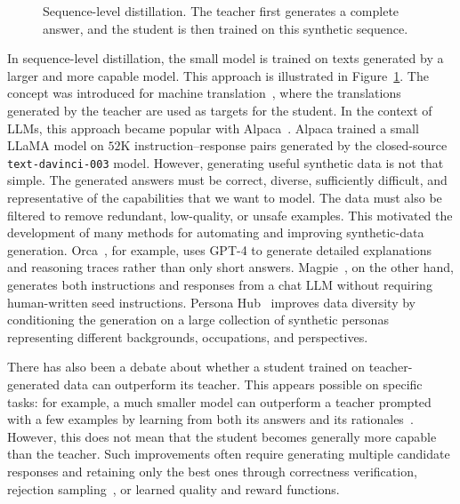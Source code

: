 \begin{figure}[!ht]
    \caption{Sequence-level distillation. The teacher first generates a complete answer, and the student is then trained on this synthetic sequence.}
    \label{fig:sequence-level-distillation}
\end{figure}

In sequence-level distillation, the small model is trained on texts generated by a larger and more capable model. 
This approach is illustrated in Figure~\ref{fig:sequence-level-distillation}. 
The concept was introduced for machine translation~\citep{kim2016sequence},
where the translations generated by the teacher are used as targets for the student.
In the context of LLMs, this approach became popular with Alpaca~\citep{taori2023alpaca}. Alpaca trained a small LLaMA model on $52$K instruction--response 
pairs generated by the closed-source \texttt{text-davinci-003} model.
However, generating useful synthetic data is not that simple.
The generated answers must be correct, diverse, sufficiently difficult, 
and representative of the capabilities that we want to model. 
The data must also be filtered to remove redundant, low-quality, or unsafe examples. 
This motivated the development of many methods for automating and improving synthetic-data generation.
Orca~\citep{mukherjee2023orca}, for example, uses GPT-4 to generate detailed 
explanations and reasoning traces rather than only short answers. 
Magpie~\citep{xu2024magpie}, on the other hand, generates both instructions and 
responses from a chat LLM without requiring human-written seed instructions. 
Persona Hub~\citep{ge2024persona} improves data diversity by conditioning 
the generation on a large collection of synthetic personas representing 
different backgrounds, occupations, and perspectives.

There has also been a debate about whether a student trained on teacher-generated data 
can outperform its teacher. This appears possible on specific tasks: for example, a much smaller model can outperform a teacher prompted with a few examples
by learning from both its answers and its rationales~\citep{hsieh2023distilling}.
However, this does not mean that the student becomes generally more capable than 
the teacher. Such improvements often require generating multiple candidate 
responses and retaining only the best ones through correctness verification, 
rejection sampling~\citep{yuan2023scaling}, or learned quality and reward functions. 

